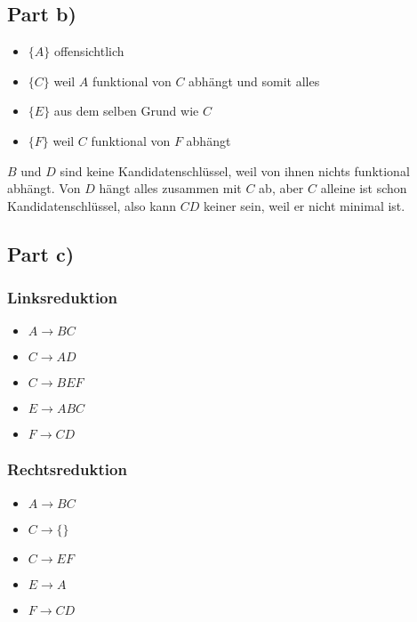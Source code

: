 \documentclass[10pt,a4paper]{article}
\begin{document}
\subsection*{Part b)}

\begin{itemize}
\item $\{ A \}$ offensichtlich
\item $\{ C \}$ weil $A$ funktional von $C$ abhängt und somit alles
\item $\{ E \}$ aus dem selben Grund wie $C$
\item $\{ F \}$ weil $C$ funktional von $F$ abhängt
\end{itemize}

$B$ und $D$ sind keine Kandidatenschlüssel, weil von ihnen nichts funktional abhängt.
Von $D$ hängt alles zusammen mit $C$ ab, aber $C$ alleine ist schon Kandidatenschlüssel, also kann $CD$ keiner sein, weil er nicht minimal ist.

\subsection*{Part c)}

\subsubsection*{Linksreduktion}

\begin{itemize}
\item $A \rightarrow BC$
\item $C \rightarrow AD$
\item $C \rightarrow BEF$
\item $E \rightarrow ABC$
\item $F \rightarrow CD$
\end{itemize}

\subsubsection*{Rechtsreduktion}

\begin{itemize}
\item $A \rightarrow BC$
\item $C \rightarrow \{  \}$
\item $C \rightarrow EF$
\item $E \rightarrow A$
\item $F \rightarrow CD$
\end{itemize}
\end{document}
